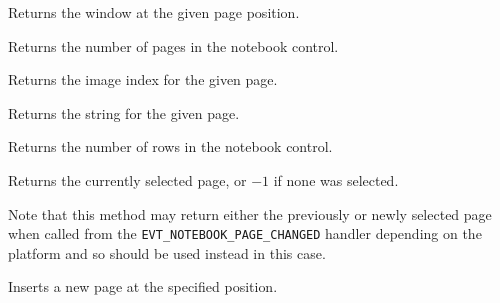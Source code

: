 Returns the window at the given page position.

\label{wxnotebookgetpagecount}


Returns the number of pages in the notebook control.

\label{wxnotebookgetpageimage}


Returns the image index for the given page.

\label{wxnotebookgetpagetext}


Returns the string for the given page.

\label{wxnotebookgetrowcount}


Returns the number of rows in the notebook control.

\label{wxnotebookgetselection}


Returns the currently selected page, or $-1$ if none was selected.

Note that this method may return either the previously or newly selected page
when called from the {\tt EVT\_NOTEBOOK\_PAGE\_CHANGED} handler depending on
the platform and so\rtfsp
{} should be
used instead in this case.

\label{wxnotebookinsertpage}


Inserts a new page at the specified position.





